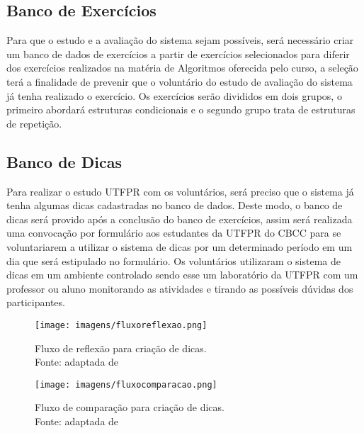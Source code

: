 \subsection{Banco de Exercícios}

Para que o estudo e a avaliação do sistema sejam possíveis, será necessário criar um banco de dados de exercícios a partir de exercícios selecionados para diferir dos exercícios realizados na matéria de Algoritmos oferecida pelo curso, a seleção terá a finalidade de prevenir que o voluntário do estudo de avaliação do sistema já tenha realizado o exercício. Os exercícios serão divididos em dois grupos, o primeiro abordará estruturas condicionais e o segundo grupo trata de estruturas de repetição.

\subsection{Banco de Dicas}

Para realizar o estudo UTFPR com os voluntários, será preciso que o sistema já tenha algumas dicas cadastradas no banco de dados. Deste modo, o banco de dicas será provido após a conclusão do banco de exercícios, assim será realizada uma convocação por formulário  aos estudantes da UTFPR do CBCC para se voluntariarem a utilizar o sistema de dicas por um determinado período em um dia que será estipulado no formulário. Os voluntários utilizaram o sistema de dicas em um ambiente controlado sendo esse um laboratório da UTFPR com um professor ou aluno monitorando as atividades e tirando as possíveis dúvidas dos participantes. 

\begin{figure}[ht]
	\centering
	\captionsetup{justification=centering}
	\texttt{[image: imagens/fluxoreflexao.png]}
	\caption[Fluxo de reflexão para criação de dicas]{Fluxo de reflexão para criação de dicas. \\ Fonte: adaptada de }
	\label{figura:fluxoreflexao}
\end{figure}

\begin{figure}[ht]
	\centering
	\captionsetup{justification=centering}
	\texttt{[image: imagens/fluxocomparacao.png]}
	\caption[Fluxo de comparação para criação de dicas]{Fluxo de comparação para criação de dicas. \\ Fonte: adaptada de }
	\label{figura:fluxocomparacao}
\end{figure}

